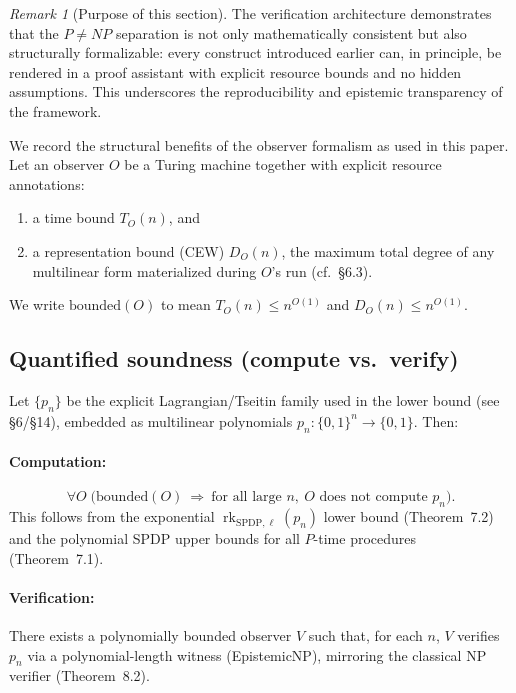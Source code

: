 \documentclass[12pt]{article}
\theoremstyle{definition}
\theoremstyle{definition}
\theoremstyle{remark}
\newtheorem{remark}{Remark}
\theoremstyle{remark}
\begin{document}
\begin{remark}[Purpose of this section]
The verification architecture demonstrates that the $P \neq NP$ separation is not only mathematically consistent but also structurally formalizable: every construct introduced earlier can, in principle, be rendered in a proof assistant with explicit resource bounds and no hidden assumptions. This underscores the reproducibility and epistemic transparency of the framework.
\end{remark}

We record the structural benefits of the observer formalism as used in this paper. Let an observer $O$ be a Turing machine together with explicit resource annotations:
\begin{enumerate}
\item a time bound $T_O(n)$, and
\item a representation bound (CEW) $D_O(n)$, the maximum total degree of any multilinear form materialized during $O$'s run (cf.\ \S6.3).
\end{enumerate}

We write $\mathrm{bounded}(O)$ to mean $T_O(n)\le n^{O(1)}$ and $D_O(n)\le n^{O(1)}$.

\subsection{Quantified soundness (compute vs.\ verify)}

Let $\{p_n\}$ be the explicit Lagrangian/Tseitin family used in the lower bound (see \S6/\S14), embedded as multilinear polynomials $p_n:\{0,1\}^n\to\{0,1\}$. Then:

\paragraph{Computation:}
\[
\forall O\;\bigl(\mathrm{bounded}(O)\ \Rightarrow\ \text{for all large } n,\ O\text{ does not compute }p_n\bigr).
\]
This follows from the exponential $\operatorname{rk}_{\mathrm{SPDP},\ell}(p_n)$ lower bound (Theorem~7.2) and the polynomial SPDP upper bounds for all $P$-time procedures (Theorem~7.1).

\paragraph{Verification:}
There exists a polynomially bounded observer $V$ such that, for each $n$, $V$ verifies $p_n$ via a polynomial-length witness (EpistemicNP), mirroring the classical NP verifier (Theorem~8.2).
\end{document}
